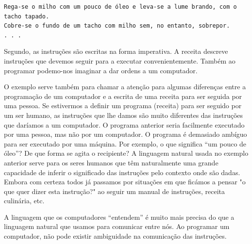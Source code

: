 \begin{lstlisting}
Rega-se o milho com um pouco de óleo e leva-se a lume brando, com o tacho tapado. 
Cobre-se o fundo de um tacho com milho sem, no entanto, sobrepor. 
. . . 
\end{lstlisting}


Segundo, as instruções são escritas na forma imperativa. A receita descreve instruções que devemos seguir para a executar convenientemente. Também ao programar podemo-nos imaginar a dar ordens a um computador.

O exemplo serve também para chamar a atenção para algumas diferenças entre a programação de um computador e a escrita de uma receita para ser seguida por uma pessoa. Se estivermos a definir um programa (receita) para ser seguido por um ser humano, as instruções que lhe damos são muito diferentes das
instruções que daríamos a um computador. O programa anterior seria facilmente executado por uma pessoa, mas não por um computador. O programa é demasiado ambíguo para ser executado por uma máquina. Por exemplo, o que significa ``um pouco de óleo''? De que forma se agita o recipiente? A linguagem natural usada no exemplo anterior serve para os seres humanos que têm naturalmente uma grande capacidade de inferir o significado das instruções pelo contexto onde são dadas. Embora com certeza todos já passamos por situações em que ficámos a pensar "o que quer dizer esta instrução?" ao seguir um manual de instruções, receita culinária, etc.

A linguagem que os computadores ``entendem'' é muito mais precisa do que a linguagem natural que usamos para comunicar entre nós. Ao programar um computador, não pode existir ambiguidade na comunicação das instruções.





%
%

